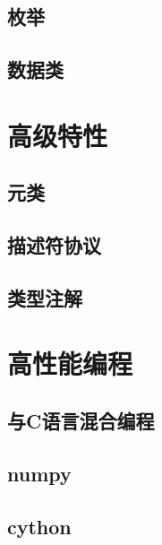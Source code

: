 \documentclass{ctexbook}
\begin{document}
	\chapter{枚举}
	\chapter{数据类}


\part{高级特性}
	\chapter{元类}
	\chapter{描述符协议}
	\chapter{类型注解}


\part{高性能编程}
\chapter{与C语言混合编程}
\chapter{numpy}
\chapter{cython}
\end{document}
